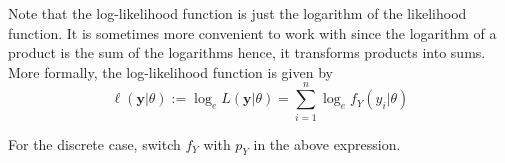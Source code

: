 \begin{remark}
    Note that the log-likelihood function is just the logarithm of the likelihood function. It is sometimes more convenient to work with
    since the logarithm of a product is the sum of the logarithms hence, it transforms products into sums. More formally, the log-likelihood function is given by
    $$\ell (\textbf{y}|\theta) := \operatorname{log}_{e}L(\textbf{y}|\theta) = \sum_{i=1}^{n} \operatorname{log}_{e} f_{Y}(y_i | \theta)$$
\end{remark}

For the discrete case, switch $f_{Y}$ with $p_{Y}$ in the above expression.